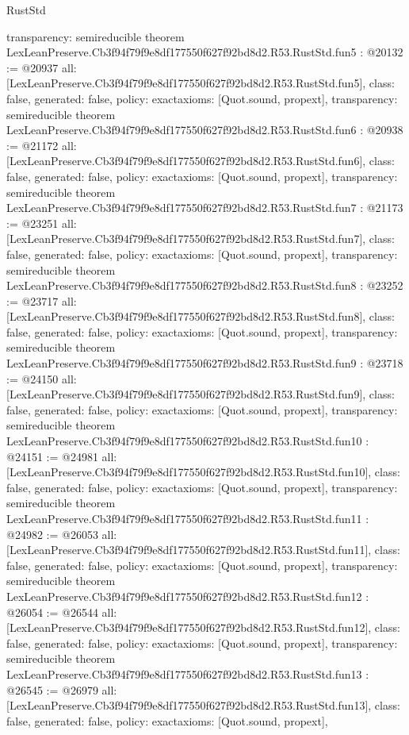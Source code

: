 \begin{lexlean}{RustStd}
\begin{coremodule}
{  transparency: semireducible
}
theorem LexLeanPreserve.Cb3f94f79f9e8df177550f627f92bd8d2.R53.RustStd.fun5 : @20132 := @20937 {
  all: [LexLeanPreserve.Cb3f94f79f9e8df177550f627f92bd8d2.R53.RustStd.fun5],
  class: false,
  generated: false,
  policy: exact{axioms: [Quot.sound, propext]},
  transparency: semireducible
}
theorem LexLeanPreserve.Cb3f94f79f9e8df177550f627f92bd8d2.R53.RustStd.fun6 : @20938 := @21172 {
  all: [LexLeanPreserve.Cb3f94f79f9e8df177550f627f92bd8d2.R53.RustStd.fun6],
  class: false,
  generated: false,
  policy: exact{axioms: [Quot.sound, propext]},
  transparency: semireducible
}
theorem LexLeanPreserve.Cb3f94f79f9e8df177550f627f92bd8d2.R53.RustStd.fun7 : @21173 := @23251 {
  all: [LexLeanPreserve.Cb3f94f79f9e8df177550f627f92bd8d2.R53.RustStd.fun7],
  class: false,
  generated: false,
  policy: exact{axioms: [Quot.sound, propext]},
  transparency: semireducible
}
theorem LexLeanPreserve.Cb3f94f79f9e8df177550f627f92bd8d2.R53.RustStd.fun8 : @23252 := @23717 {
  all: [LexLeanPreserve.Cb3f94f79f9e8df177550f627f92bd8d2.R53.RustStd.fun8],
  class: false,
  generated: false,
  policy: exact{axioms: [Quot.sound, propext]},
  transparency: semireducible
}
theorem LexLeanPreserve.Cb3f94f79f9e8df177550f627f92bd8d2.R53.RustStd.fun9 : @23718 := @24150 {
  all: [LexLeanPreserve.Cb3f94f79f9e8df177550f627f92bd8d2.R53.RustStd.fun9],
  class: false,
  generated: false,
  policy: exact{axioms: [Quot.sound, propext]},
  transparency: semireducible
}
theorem LexLeanPreserve.Cb3f94f79f9e8df177550f627f92bd8d2.R53.RustStd.fun10 : @24151 := @24981 {
  all: [LexLeanPreserve.Cb3f94f79f9e8df177550f627f92bd8d2.R53.RustStd.fun10],
  class: false,
  generated: false,
  policy: exact{axioms: [Quot.sound, propext]},
  transparency: semireducible
}
theorem LexLeanPreserve.Cb3f94f79f9e8df177550f627f92bd8d2.R53.RustStd.fun11 : @24982 := @26053 {
  all: [LexLeanPreserve.Cb3f94f79f9e8df177550f627f92bd8d2.R53.RustStd.fun11],
  class: false,
  generated: false,
  policy: exact{axioms: [Quot.sound, propext]},
  transparency: semireducible
}
theorem LexLeanPreserve.Cb3f94f79f9e8df177550f627f92bd8d2.R53.RustStd.fun12 : @26054 := @26544 {
  all: [LexLeanPreserve.Cb3f94f79f9e8df177550f627f92bd8d2.R53.RustStd.fun12],
  class: false,
  generated: false,
  policy: exact{axioms: [Quot.sound, propext]},
  transparency: semireducible
}
theorem LexLeanPreserve.Cb3f94f79f9e8df177550f627f92bd8d2.R53.RustStd.fun13 : @26545 := @26979 {
  all: [LexLeanPreserve.Cb3f94f79f9e8df177550f627f92bd8d2.R53.RustStd.fun13],
  class: false,
  generated: false,
  policy: exact{axioms: [Quot.sound, propext]},
}
\end{coremodule}
\end{lexlean}

